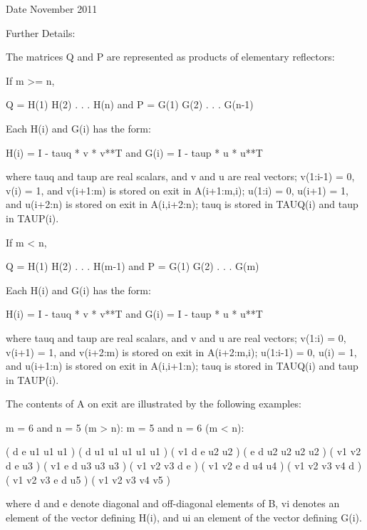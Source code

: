 \begin{DoxyDate}{Date}
November 2011 
\end{DoxyDate}
\begin{DoxyParagraph}{Further Details\+: }
\begin{DoxyVerb}  The matrices Q and P are represented as products of elementary
  reflectors:

  If m >= n,

     Q = H(1) H(2) . . . H(n)  and  P = G(1) G(2) . . . G(n-1)

  Each H(i) and G(i) has the form:

     H(i) = I - tauq * v * v**T  and G(i) = I - taup * u * u**T

  where tauq and taup are real scalars, and v and u are real vectors;
  v(1:i-1) = 0, v(i) = 1, and v(i+1:m) is stored on exit in A(i+1:m,i);
  u(1:i) = 0, u(i+1) = 1, and u(i+2:n) is stored on exit in A(i,i+2:n);
  tauq is stored in TAUQ(i) and taup in TAUP(i).

  If m < n,

     Q = H(1) H(2) . . . H(m-1)  and  P = G(1) G(2) . . . G(m)

  Each H(i) and G(i) has the form:

     H(i) = I - tauq * v * v**T  and G(i) = I - taup * u * u**T

  where tauq and taup are real scalars, and v and u are real vectors;
  v(1:i) = 0, v(i+1) = 1, and v(i+2:m) is stored on exit in A(i+2:m,i);
  u(1:i-1) = 0, u(i) = 1, and u(i+1:n) is stored on exit in A(i,i+1:n);
  tauq is stored in TAUQ(i) and taup in TAUP(i).

  The contents of A on exit are illustrated by the following examples:

  m = 6 and n = 5 (m > n):          m = 5 and n = 6 (m < n):

    (  d   e   u1  u1  u1 )           (  d   u1  u1  u1  u1  u1 )
    (  v1  d   e   u2  u2 )           (  e   d   u2  u2  u2  u2 )
    (  v1  v2  d   e   u3 )           (  v1  e   d   u3  u3  u3 )
    (  v1  v2  v3  d   e  )           (  v1  v2  e   d   u4  u4 )
    (  v1  v2  v3  v4  d  )           (  v1  v2  v3  e   d   u5 )
    (  v1  v2  v3  v4  v5 )

  where d and e denote diagonal and off-diagonal elements of B, vi
  denotes an element of the vector defining H(i), and ui an element of
  the vector defining G(i).\end{DoxyVerb}
 
\end{DoxyParagraph}
\hypertarget{group__doubleGEcomputational_ga188b8d30443d14b1a3f7f8331d87ae60}{}
